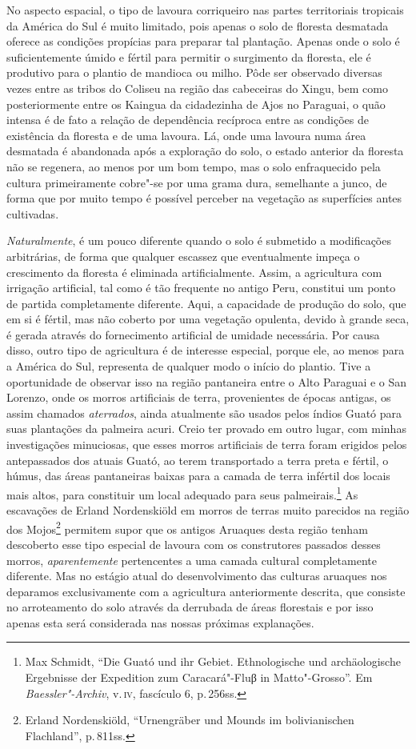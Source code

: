 No aspecto espacial, o tipo de lavoura corriqueiro nas partes
territoriais tropicais da América do Sul é muito limitado, pois apenas o
solo de floresta desmatada oferece as condições propícias para preparar
tal plantação. Apenas onde o solo é suficientemente úmido e fértil para
permitir o surgimento da floresta, ele é produtivo para o plantio de
mandioca ou milho. Pôde ser observado diversas vezes entre as tribos do Coliseu
na região das cabeceiras do Xingu, bem como posteriormente entre os Kaingua da cidadezinha de 
Ajos no Paraguai, o quão intensa é de fato a relação de dependência
recíproca entre as condições de existência da floresta e de uma lavoura. 
Lá, onde uma lavoura numa área desmatada é abandonada após
a exploração do solo, o estado anterior da floresta não se regenera, ao
menos por um bom tempo, mas o solo enfraquecido pela cultura
primeiramente cobre"-se por uma grama dura, semelhante a junco, de forma
que por muito tempo é possível perceber na vegetação as superfícies
antes cultivadas.

\textit{Naturalmente}, é um pouco diferente quando o solo é submetido a
modificações arbitrárias, de forma que qualquer escassez que
eventualmente impeça o crescimento da floresta é eliminada
artificialmente. Assim, a agricultura com irrigação artificial, tal como
é tão frequente no antigo Peru, constitui um ponto de partida
completamente diferente. Aqui, a capacidade de produção do solo, que em
si é fértil, mas não coberto por uma vegetação opulenta, devido à grande
seca, é gerada através do fornecimento artificial de umidade necessária.
Por causa disso, outro tipo de agricultura é de interesse especial,
porque ele, ao menos para a América do Sul, representa de qualquer modo
o início do plantio. Tive a oportunidade de observar isso na região
pantaneira entre o Alto Paraguai e o San Lorenzo, onde os morros
artificiais de terra, provenientes de épocas antigas, os assim chamados
\textit{aterrados}, ainda atualmente são usados pelos índios Guató para suas
plantações da palmeira acuri. Creio ter provado em outro lugar, com
minhas investigações minuciosas, que esses morros artificiais de terra
foram erigidos pelos antepassados dos atuais Guató, ao terem
transportado a terra preta e fértil, o húmus, das áreas pantaneiras
baixas para a camada de terra infértil dos locais mais altos, para
constituir um local adequado para seus palmeirais.\footnote{Max Schmidt,
  ``Die Guató und ihr Gebiet. Ethnologische und archäologische
  Ergebnisse der Expedition zum Caracará"-Fluβ in Matto"-Grosso''. Em
  \textit{Baessler"-Archiv}, v.\,\textsc{iv}, fascículo 6, p.\,256ss.} As escavações
de Erland Nordenskiöld em morros de terras muito parecidos na região dos
Mojos\footnote{Erland Nordenskiöld, ``Urnengräber und Mounds im
  bolivianischen Flachland'', p.\,811ss.} permitem supor que os
antigos Aruaques desta região tenham descoberto esse tipo especial de lavoura
com os construtores passados desses morros, \textit{aparentemente} pertencentes
a uma camada cultural completamente diferente. Mas no estágio atual do
desenvolvimento das culturas aruaques nos deparamos exclusivamente com a
agricultura anteriormente descrita, que consiste no arroteamento do solo
através da derrubada de áreas florestais e por isso apenas esta será
considerada nas nossas próximas explanações.

